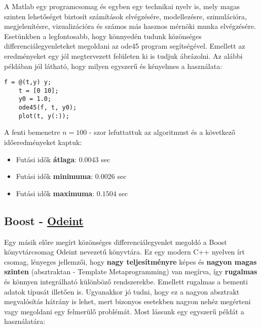A Matlab egy programcsomag és egyben egy technikai nyelv is, mely magas szinten lehetőséget biztosít számítások elvégzésére, modellezésre, szimulációra, megjelenítésre, vizualizációra és számos más hasznos mérnöki munka elvégzésére. Esetünkben a legfontosabb, hogy könnyedén tudunk közönséges differenciálegyenleteket megoldani az ode45 program segítségével. Emellett az eredményeket egy jól megtervezett felületen ki is tudjuk ábrázolni. Az alábbi példában jól látható, hogy milyen egyszerű és kényelmes a használata:

\begin{lstlisting}[caption={Matlab példakód diff. egyenlet megoldására.}, captionpos=b]
	f = @(t,y) y;
	t = [0 10];
	y0 = 1.0;
	ode45(f, t, y0);
	plot(t, y(:));
\end{lstlisting}


A fenti bemenetre $ n = 100 $ - szor lefuttattuk az algoritmust és a következő időeredményeket kaptuk:
\begin{itemize}
	\item Futási idők \textbf{átlaga}: $ 0.0043 $ sec
	\item Futási idők \textbf{minimuma}: $ 0.0026 $ sec
	\item Futási idők \textbf{maximuma}: $ 0.1504 $ sec
\end{itemize}




\begin{center}
\end{center}

\subsection {Boost - \href{http://headmyshoulder.github.io/odeint-v2/}{Odeint}} \label{BoostOdeint}

Egy másik előre megírt közönséges differenciálegyenlet megoldó a Boost könyvtárcsomag Odeint nevezetű könyvtára. Ez egy modern C++ nyelven írt csomag, lényeges jellemzői, hogy \textbf{nagy teljesítményre} képes és \textbf{nagyon magas szinten} (absztraktan - Template Metaprogramming) van megírva, így \textbf{rugalmas} és könnyen integrálható különböző rendszerekbe. Emellett rugalmas a bementi adatok típusát illetően is. Ugyanakkor jó tudni, hogy ez a nagyon absztrakt megvalósítás hátrány is lehet, mert bizonyos esetekben nagyon nehéz megérteni vagy megoldani egy felmerülő problémát. Most lássunk egy egyszerű példát a használatára:

